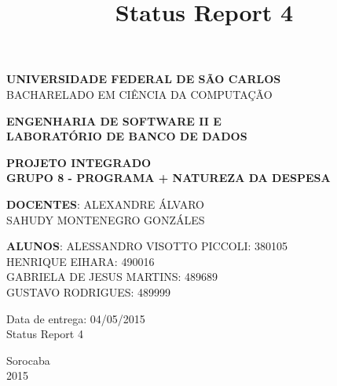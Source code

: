 \documentclass[a4paper,12pt]{article}
\title{Status Report 4}
\begin{document}
\renewcommand*\sectionmark[1]{\markboth{#1}{}}
\renewcommand*\subsectionmark[1]{\markboth{#1}{}}


\begin{titlepage}
\begin{center}
{\bf \large UNIVERSIDADE FEDERAL DE SÃO CARLOS}\\[0.2cm]
{\large BACHARELADO EM CIÊNCIA DA COMPUTAÇÃO}\\[0.2cm]

\end{center}

\vfill
\begin{center}
{\bf \large ENGENHARIA DE SOFTWARE II E\\LABORATÓRIO DE BANCO DE DADOS}\\[3.2cm]
\end{center}

\begin{center}
{\bf \LARGE PROJETO INTEGRADO}\\[0.3cm]
{\bf \Large GRUPO 8 - PROGRAMA + NATUREZA DA DESPESA}\\[2.2cm]
\end{center}

\vfill
\begin{flushright}
{\large \textbf{DOCENTES}: ALEXANDRE ÁLVARO}\\[0.2cm]
{\large SAHUDY MONTENEGRO GONZÁLES}\\[0.5cm]
\end{flushright}

\vfill
\begin{flushright}
{\large {\bf ALUNOS}: ALESSANDRO VISOTTO PICCOLI: 380105}\\[0.15cm]
{\large HENRIQUE EIHARA: 490016}\\[0.15cm]
{\large GABRIELA DE JESUS MARTINS: 489689}\\[0.15cm]
{\large GUSTAVO RODRIGUES: 489999}\\[0.15cm]
\end{flushright}

\vfill
\begin{flushright}
{\large Data de entrega: 04/05/2015}\\[0.2cm]
{\large Status Report 4}\\[2.0cm]
\end{flushright}

\begin{center}
{\large Sorocaba}\\[0.2cm]
{\large 2015}
\end{center}

\end{titlepage}
\end{document}

